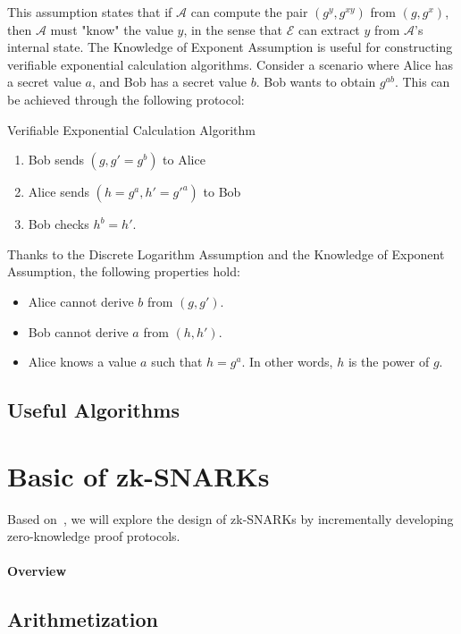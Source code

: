 \documentclass{article}
\begin{document}
This assumption states that if $\mathcal{A}$ can compute the pair $(g^y, g^{xy})$ from $(g, g^x)$, then $\mathcal{A}$ must "know" the value $y$, in the sense that $\mathcal{E}$ can extract $y$ from $\mathcal{A}$'s internal state.
The Knowledge of Exponent Assumption is useful for constructing verifiable exponential calculation algorithms. Consider a scenario where Alice has a secret value $a$, and Bob has a secret value $b$. Bob wants to obtain $g^{ab}$. This can be achieved through the following protocol:

\begin{protocol}{Verifiable Exponential Calculation Algorithm}{}
    \begin{enumerate}
    \item Bob sends $(g, g'=g^{b})$ to Alice
    \item Alice sends $(h=g^{a}, h'=g'^{a})$ to Bob
    \item Bob checks $h^{b} = h'$.
\end{enumerate}
\end{protocol}

Thanks to the Discrete Logarithm Assumption and the Knowledge of Exponent Assumption, the following properties hold:
\begin{itemize}
\item Alice cannot derive $b$ from $(g, g')$.
\item Bob cannot derive $a$ from $(h, h')$.
\item Alice knows a value $a$ such that $h = g^a$. In other words, $h$ is the power of $g$.
\end{itemize}
\subsection{Useful Algorithms}

\section{Basic of zk-SNARKs}

Based on~\cite{petkus2019and}, we will explore the design of zk-SNARKs by incrementally developing zero-knowledge proof protocols.

\paragraph{Overview}

\subsection{Arithmetization}
\end{document}
